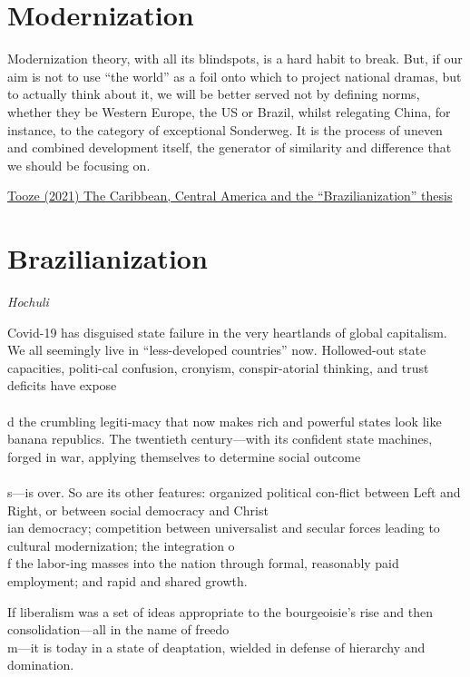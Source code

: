 \documentclass[
]{book}
\begin{document}
\hypertarget{modernization}{%
\section{Modernization}\label{modernization}}

Modernization theory, with all its blindspots, is a hard habit to break.
But, if our aim is not to use ``the world'' as a foil onto which to project national dramas, but to actually think about it, we will be better served not by defining norms, whether they be Western Europe, the US or Brazil, whilst relegating China, for instance, to the category of exceptional Sonderweg. It is the process of uneven and combined development itself, the generator of similarity and difference that we should be focusing on.

\href{https://adamtooze.substack.com/p/chartbook-newsletter-20}{Tooze (2021) The Caribbean, Central America and the ``Brazilianization'' thesis}

\hypertarget{brazilianization}{%
\section{Brazilianization}\label{brazilianization}}

\emph{Hochuli}

Covid-19 has disguised state failure in the very heartlands of global capitalism.
We all seemingly live in ``less-developed countries'' now.
Hollowed-out state capacities, politi-cal confusion, cronyism, conspir-atorial thinking, and trust deficits have expose\\
~\\
d the crumbling legiti-macy that now makes rich and powerful states look like banana republics.
The twentieth century---with its confident state machines, forged in war, applying themselves to determine social outcome\\
~\\
s---is over.
So are its other features: organized political con-flict between Left and Right, or between social democracy and Christ\\
ian democracy; competition between universalist and secular forces leading to cultural modernization; the integration o\\
f the labor-ing masses into the nation through formal, reasonably paid employment; and rapid and shared growth.

If liberalism was a set of ideas appropriate to the bourgeoisie's rise and then consolidation---all in the name of freedo\\
m---it is today in a state of deaptation, wielded in defense of hierarchy and domination.
\end{document}
